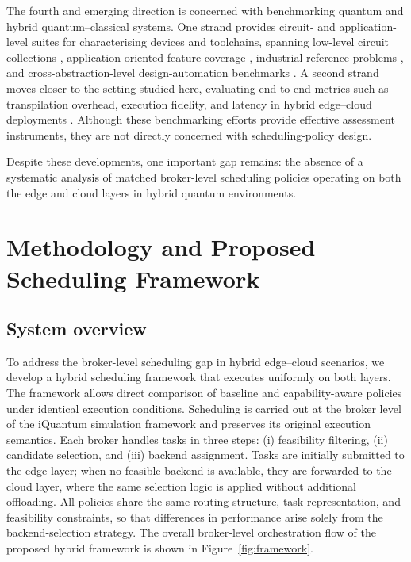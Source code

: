 \documentclass[preprint,12pt]{elsarticle}
\begin{document}
The fourth and emerging direction is concerned with benchmarking quantum and
hybrid quantum--classical systems. One strand provides circuit- and
application-level suites for characterising devices and toolchains, spanning
low-level circuit collections \cite{li2020}, application-oriented feature
coverage \cite{tomesh2022}, industrial reference problems \cite{finzgar2024},
and cross-abstraction-level design-automation benchmarks
\cite{quetschlich2023}. A second strand moves closer to the setting studied
here, evaluating end-to-end metrics such as transpilation overhead, execution
fidelity, and latency in hybrid edge--cloud deployments \cite{yao2025}. Although
these benchmarking efforts provide effective assessment instruments, they are
not directly concerned with scheduling-policy design.

Despite these developments, one important gap remains: the absence of a
systematic analysis of matched broker-level scheduling policies operating on
both the edge and cloud layers in hybrid quantum environments.

\section{Methodology and Proposed Scheduling Framework}
\label{sec:method}

\subsection{System overview}
To address the broker-level scheduling gap in hybrid edge--cloud scenarios, we
develop a hybrid scheduling framework that executes uniformly on both layers.
The framework allows direct comparison of baseline and capability-aware policies
under identical execution conditions. Scheduling is carried out at the broker
level of the iQuantum simulation framework and preserves its original execution
semantics. Each broker handles tasks in three steps: (i) feasibility filtering,
(ii) candidate selection, and (iii) backend assignment. Tasks are initially
submitted to the edge layer; when no feasible backend is available, they are
forwarded to the cloud layer, where the same selection logic is applied without
additional offloading. All policies share the same routing structure, task
representation, and feasibility constraints, so that differences in performance
arise solely from the backend-selection strategy. The overall broker-level
orchestration flow of the proposed hybrid framework is shown in
Figure~\ref{fig:framework}.
\end{document}
